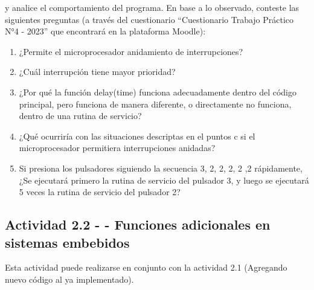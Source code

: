 \documentclass{article}
\begin{document}
\begin{enumerate}[leftmargin=0pt]
y analice el comportamiento del programa. En base a lo observado, conteste las siguientes preguntas (a través del cuestionario “Cuestionario Trabajo Práctico N°4 - 2023” que encontrará en la plataforma Moodle):

\begin{enumerate}
    \item ¿Permite el microprocesador anidamiento de interrupciones?
    \item ¿Cuál interrupción tiene mayor prioridad?
    \item ¿Por qué la función delay(time) funciona adecuadamente dentro del código principal, pero funciona de manera diferente, o directamente no funciona, dentro de una rutina de servicio?
    \item ¿Qué ocurriría con las situaciones descriptas en el puntos c si el microprocesador permitiera interrupciones anidadas?
    \item Si presiona los pulsadores siguiendo la secuencia 3, 2, 2, 2, 2 ,2 rápidamente, ¿Se ejecutará primero la rutina de servicio del pulsador 3, y luego se ejecutará 5 veces la rutina de servicio del pulsador 2?
\end{enumerate}

\end{enumerate}

\subsection*{Actividad 2.2 - - Funciones adicionales en sistemas embebidos}

Esta actividad puede realizarse en conjunto con la actividad 2.1 (Agregando nuevo código al ya implementado).
\end{document}
